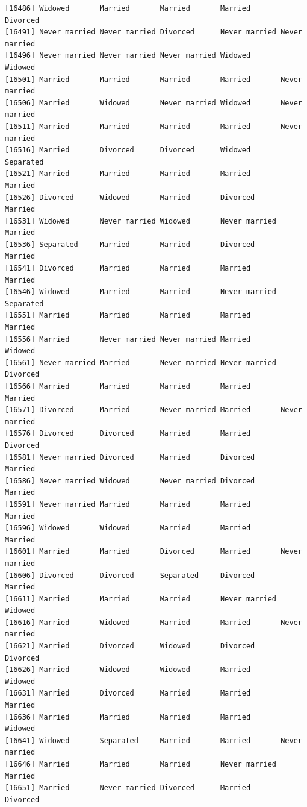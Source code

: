 \documentclass[
  letterpaper,
  DIV=11,
  numbers=noendperiod,
  oneside]{scrartcl}
\begin{document}
\begin{verbatim}
[16486] Widowed       Married       Married       Married       Divorced     
[16491] Never married Never married Divorced      Never married Never married
[16496] Never married Never married Never married Widowed       Widowed      
[16501] Married       Married       Married       Married       Never married
[16506] Married       Widowed       Never married Widowed       Never married
[16511] Married       Married       Married       Married       Never married
[16516] Married       Divorced      Divorced      Widowed       Separated    
[16521] Married       Married       Married       Married       Married      
[16526] Divorced      Widowed       Married       Divorced      Married      
[16531] Widowed       Never married Widowed       Never married Married      
[16536] Separated     Married       Married       Divorced      Married      
[16541] Divorced      Married       Married       Married       Married      
[16546] Widowed       Married       Married       Never married Separated    
[16551] Married       Married       Married       Married       Married      
[16556] Married       Never married Never married Married       Widowed      
[16561] Never married Married       Never married Never married Divorced     
[16566] Married       Married       Married       Married       Married      
[16571] Divorced      Married       Never married Married       Never married
[16576] Divorced      Divorced      Married       Married       Divorced     
[16581] Never married Divorced      Married       Divorced      Married      
[16586] Never married Widowed       Never married Divorced      Married      
[16591] Never married Married       Married       Married       Married      
[16596] Widowed       Widowed       Married       Married       Married      
[16601] Married       Married       Divorced      Married       Never married
[16606] Divorced      Divorced      Separated     Divorced      Married      
[16611] Married       Married       Married       Never married Widowed      
[16616] Married       Widowed       Married       Married       Never married
[16621] Married       Divorced      Widowed       Divorced      Divorced     
[16626] Married       Widowed       Widowed       Married       Widowed      
[16631] Married       Divorced      Married       Married       Married      
[16636] Married       Married       Married       Married       Widowed      
[16641] Widowed       Separated     Married       Married       Never married
[16646] Married       Married       Married       Never married Married      
[16651] Married       Never married Divorced      Married       Divorced     

\end{verbatim}
\end{document}
